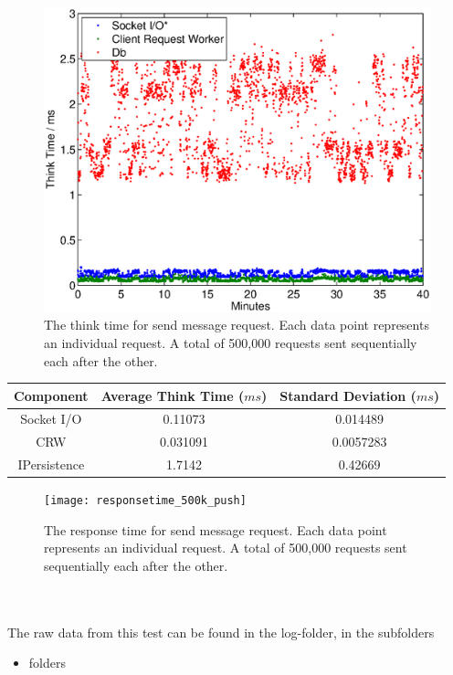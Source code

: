 \documentclass{article}
\begin{document}
                \begin{figure}[H]
                    \includegraphics[scale=0.50]{thinktime_500k_push}
                    \caption{The think time for send message request. Each data point represents an individual request. A total of 500,000 requests sent sequentially each after the other.}
                    \label{fig:thinktime_500k_push}
                \end{figure}
                \begin{table}[H]
                    \begin{tabular}{|c|c|c|}
                        \hline 
                        \textbf{Component} & \textbf{Average Think Time} ($ms$)  & \textbf{Standard Deviation ($ms$)} \\ 
                        \hline
                        Socket I/O &0.11073 &0.014489\\
                        \hline 
                        CRW &0.031091 &0.0057283\\
                        \hline 
                        IPersistence &1.7142 &0.42669 \\
                        \hline 
                    \end{tabular}
                \end{table} 
                
                \begin{figure}[H]
                    \texttt{[image: responsetime\_500k\_push]}
                    \caption{The response time for send message request. Each data point represents an individual request. A total of 500,000 requests sent sequentially each after the other.}
                    \label{fig:responsetime_500k_push}
                \end{figure}
                ~\\
                \\
                The raw data from this test can be found in the log-folder, in the subfolders
                \begin{itemize}
                    \item folders
                \end{itemize}
\end{document}
